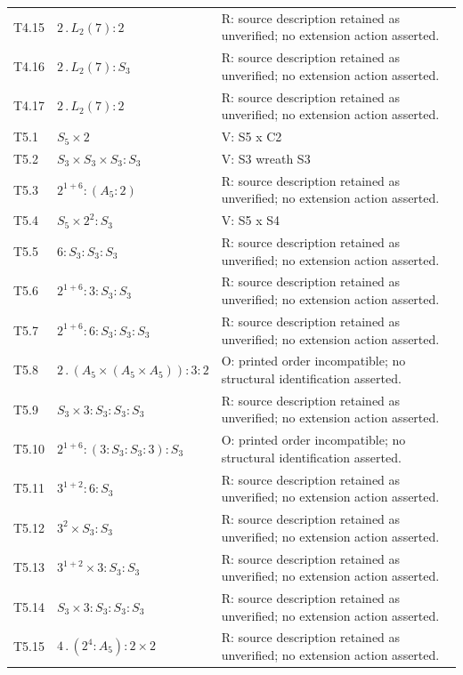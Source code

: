 \begin{longtable}{@{}lp{.40\linewidth}p{.46\linewidth}@{}}
T4.15 & $2 \mathbin{.} L_{2}(7) : 2$ & R: source description retained as unverified; no extension action asserted.\\
T4.16 & $2 \mathbin{.} L_{2}(7) : S_{3}$ & R: source description retained as unverified; no extension action asserted.\\
T4.17 & $2 \mathbin{.} L_{2}(7) : 2$ & R: source description retained as unverified; no extension action asserted.\\
T5.1 & $S_{5} \times 2$ & V: S5 x C2\\
T5.2 & $S_{3} \times S_{3} \times S_{3} : S_{3}$ & V: S3 wreath S3\\
T5.3 & $2^{1+6} : (A_{5} : 2)$ & R: source description retained as unverified; no extension action asserted.\\
T5.4 & $S_{5} \times 2^2 : S_{3}$ & V: S5 x S4\\
T5.5 & $6 : S_{3} : S_{3} : S_{3}$ & R: source description retained as unverified; no extension action asserted.\\
T5.6 & $2^{1+6} : 3 : S_{3} : S_{3}$ & R: source description retained as unverified; no extension action asserted.\\
T5.7 & $2^{1+6} : 6 : S_{3} : S_{3} : S_{3}$ & R: source description retained as unverified; no extension action asserted.\\
T5.8 & $2 \mathbin{.} (A_{5} \times (A_{5} \times A_{5})) : 3 : 2$ & O: printed order incompatible; no structural identification asserted.\\
T5.9 & $S_{3} \times 3 : S_{3} : S_{3} : S_{3}$ & R: source description retained as unverified; no extension action asserted.\\
T5.10 & $2^{1+6} : (3 : S_{3} : S_{3} : 3) : S_{3}$ & O: printed order incompatible; no structural identification asserted.\\
T5.11 & $3^{1+2} : 6 : S_{3}$ & R: source description retained as unverified; no extension action asserted.\\
T5.12 & $3^2 \times S_{3} : S_{3}$ & R: source description retained as unverified; no extension action asserted.\\
T5.13 & $3^{1+2} \times 3 : S_{3} : S_{3}$ & R: source description retained as unverified; no extension action asserted.\\
T5.14 & $S_{3} \times 3 : S_{3} : S_{3} : S_{3}$ & R: source description retained as unverified; no extension action asserted.\\
T5.15 & $4 \mathbin{.} (2^4 : A_{5}) : 2 \times 2$ & R: source description retained as unverified; no extension action asserted.\\

\end{longtable}
